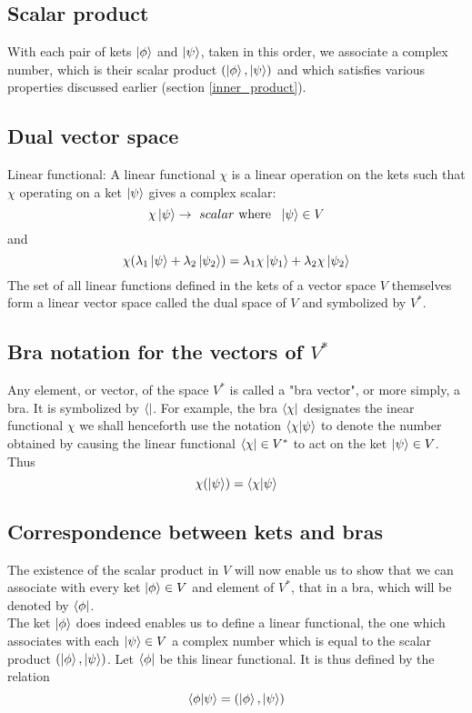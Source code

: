 \subsection{Scalar product}
With each pair of kets $\ket{\phi}$ and $\ket{\psi}$, taken in this order, we associate a complex number, which is their scalar product $(\ket{\phi}, \ket{\psi})$ and which satisfies various properties discussed earlier (section \ref{inner_product}).

\subsection{Dual vector space}
Linear functional: A linear functional $\chi$ is a linear operation on the kets such that $\chi$ operating on a ket $\ket{\psi}$ gives a complex scalar:
\begin{equation}
\chi \ket{\psi} \rightarrow \ scalar \text{ where } \ \ket{\psi} \in V
\end{equation}
and
\begin{equation}
\chi (\lambda_1 \ket{\psi} + \lambda_2 \ket{\psi_2}) = \lambda_1 \chi \ket{\psi_1} + \lambda_2 \chi \ket{\psi_2}
\end{equation}
The set of all linear functions defined in the kets of a vector space $V$ themselves form a linear vector space called the dual space of $V$ and symbolized by $V^*$.

\subsection{Bra notation for the vectors of \texorpdfstring{$V^*$}{PDFstring}}
Any element, or vector, of the space $V^*$ is called a "bra vector", or more simply, a bra. It is symbolized by $\bra{}$. For example, the bra $\bra{\chi}$ designates the inear functional $\chi$ we shall henceforth use the notation $\braket{\chi}{\psi}$ to denote the number obtained by causing the linear functional $\bra{\chi} \in V^*$ to act on the ket $\ket{\psi} \in V$. Thus
\begin{equation}
\chi (\ket{\psi}) = \braket{\chi}{\psi}
\end{equation}

\subsection{Correspondence between kets and bras}
The existence of the scalar product in $V$ will now enable us to show that we can associate with every ket $\ket{\phi} \in V$ and element of $V^*$, that in a bra, which will be denoted by $\bra{\phi}$.\\
The ket $\ket{\phi}$ does indeed enables us to define a linear functional, the one which associates with each $\ket{\psi} \in V$ a complex number which is equal to the scalar product $(\ket{\phi} , \ket{\psi})$. Let $\bra{\phi}$ be this linear functional. It is thus defined by the relation
\begin{equation}
\braket{\phi}{\psi} = ( \ket{\phi}, \ket{\psi} )
\end{equation}

